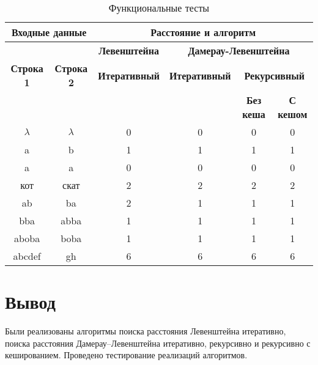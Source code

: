 \begin{table}[ht]
	\small
	\begin{center}
		\begin{threeparttable}
		\caption{Функциональные тесты}
		\label{tbl:func_tests}
		\begin{tabular}{|c|c|c|c|c|c|}
			\hline
			\multicolumn{2}{|c|}{\bfseries Входные данные}
			& \multicolumn{4}{c|}{\bfseries Расстояние и алгоритм} \\ 
			\hline 
			&
			& \multicolumn{1}{c|}{\bfseries Левенштейна} 
			& \multicolumn{3}{c|}{\bfseries Дамерау-Левенштейна} \\ \cline{3-6}
			
			\bfseries Строка 1 & \bfseries Строка 2 & \bfseries Итеративный & \bfseries Итеративный
			
			& \multicolumn{2}{c|}{\bfseries Рекурсивный} \\ \cline{5-6}
			& & & & \bfseries Без кеша & \bfseries С кешом \\
			\hline
			$\lambda$ & $\lambda$ & 0 & 0 & 0 & 0 \\
			\hline
			a & b & 1 & 1 & 1 & 1 \\
			\hline
			a & a & 0 & 0 & 0 & 0 \\
			\hline
			кот & скат & 2 & 2 & 2 & 2 \\
			\hline
			ab & ba & 2 & 1 & 1 & 1 \\
			\hline
			bba & abba & 1 & 1 & 1 & 1 \\
			\hline
			aboba & boba & 1 & 1 & 1 & 1 \\
			\hline
			abcdef & gh & 6 & 6 & 6 & 6 \\
			\hline
			
		\end{tabular}	
		\end{threeparttable}
	\end{center}
\end{table}

\section*{Вывод}

Были реализованы алгоритмы поиска расстояния Левенштейна итеративно, поиска расстояния Дамерау–Левенштейна итеративно, рекурсивно и рекурсивно с кешированием. Проведено тестирование реализаций алгоритмов.
